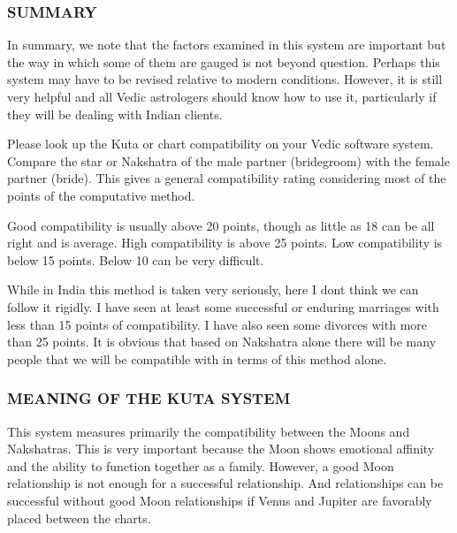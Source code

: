  

\subsubsection{SUMMARY}

 

In summary, we note that the factors examined in this system are important but the way in which some of them are gauged is not beyond question. Perhaps this system may have to be revised relative to modern conditions. However, it is still very helpful and all Vedic astrologers should know how to use it, particularly if they will be dealing with Indian clients.

 

Please look up the Kuta or chart compatibility on your Vedic software system.  Compare the star or Nakshatra of the male partner (bridegroom) with the female partner (bride). This gives a general compatibility rating considering most of the points of the computative method.

 

Good compatibility is usually above 20 points, though as little as 18 can be all right and is average. High compatibility is above 25 points. Low compatibility is below 15 points. Below 10 can be very difficult.

 

While in India this method is taken very seriously, here I dont think we can follow it rigidly. I have seen at least some successful or enduring marriages with less than 15 points of compatibility. I have also seen some divorces with more than 25 points. It is obvious that based on Nakshatra alone there will be many people that we will be compatible with in terms of this method alone.

 

\subsubsection{MEANING OF THE KUTA SYSTEM}

 

This system measures primarily the compatibility between the Moons and Nakshatras. This is very important because the Moon shows emotional affinity and the ability to function together as a family. However, a good Moon relationship is not enough for a successful relationship. And relationships can be successful without good Moon relationships if Venus and Jupiter are favorably placed between the charts.

